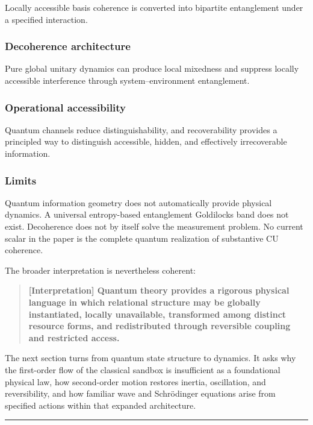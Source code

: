 \documentclass[
  11pt,
]{article}
\begin{document}
Locally accessible basis coherence is converted into bipartite
entanglement under a specified interaction.

\subsubsection{Decoherence architecture}\label{decoherence-architecture}

Pure global unitary dynamics can produce local mixedness and suppress
locally accessible interference through system--environment
entanglement.

\subsubsection{Operational
accessibility}\label{operational-accessibility}

Quantum channels reduce distinguishability, and recoverability provides
a principled way to distinguish accessible, hidden, and effectively
irrecoverable information.

\subsubsection{Limits}\label{limits}

Quantum information geometry does not automatically provide physical
dynamics. A universal entropy-based entanglement Goldilocks band does
not exist. Decoherence does not by itself solve the measurement problem.
No current scalar in the paper is the complete quantum realization of
substantive CU coherence.

The broader interpretation is nevertheless coherent:

\begin{quote}
\textbf{{[}Interpretation{]} Quantum theory provides a rigorous physical
language in which relational structure may be globally instantiated,
locally unavailable, transformed among distinct resource forms, and
redistributed through reversible coupling and restricted access.}
\end{quote}

The next section turns from quantum state structure to dynamics. It asks
why the first-order flow of the classical sandbox is insufficient as a
foundational physical law, how second-order motion restores inertia,
oscillation, and reversibility, and how familiar wave and Schrödinger
equations arise from specified actions within that expanded
architecture.

\begin{center}\rule{0.5\linewidth}{0.5pt}\end{center}
\end{document}
